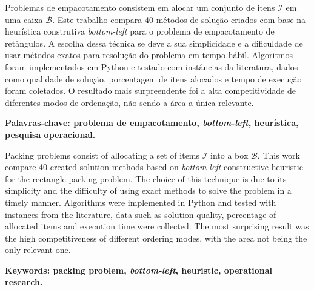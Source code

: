
\begin{resumo}
    Problemas de empacotamento consistem em alocar um conjunto de itens $\mathcal{I}$ em uma
    caixa $\mathcal{B}$.
    Este trabalho compara 40 métodos de solução criados com base na heurística construtiva
    \textit{bottom-left} para o problema de empacotamento de retângulos.
    A escolha dessa técnica se deve a sua simplicidade e a dificuldade de usar métodos exatos
    para resolução do problema em tempo hábil.
    Algoritmos foram implementados em Python e testado com instâncias da literatura, dados como
    qualidade de solução, porcentagem de itens alocados e tempo de execução foram coletados.
    O resultado mais surpreendente foi a alta competitividade de diferentes modos de ordenação,
    não sendo a área a única relevante.

    \textbf{Palavras-chave: problema de empacotamento, \textit{bottom-left}, heurística,
        pesquisa operacional.}
\end{resumo}
\newpage

\begin{resumo}[Abstract]
    Packing problems consist of allocating a set of items $\mathcal{I}$ into a box $\mathcal{B}$.
    This work compare 40 created solution methods based on \textit{bottom-left} constructive
    heuristic for the rectangle packing problem.
    The choice of this technique is due to its simplicity and the difficulty of using exact methods
    to solve the problem in a timely manner.
    Algorithms were implemented in Python and tested with instances from the literature,
    data such as solution quality, percentage of allocated items and execution time were collected.
    The most surprising result was the high competitiveness of different ordering modes,
    with the area not being the only relevant one.

    \textbf{Keywords: packing problem, \textit{bottom-left}, heuristic, operational research.}
\end{resumo}
\newpage
